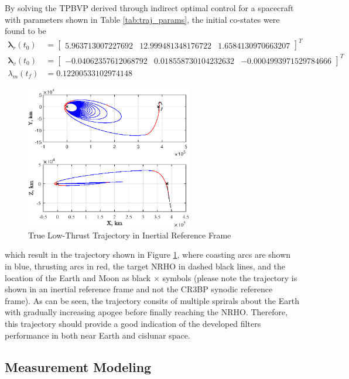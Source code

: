 \documentclass[letterpaper, submit]{AAS}			%
\begin{document}
By solving the TPBVP derived through indirect optimal control for a spacecraft with parameters shown in Table \ref{tab:traj_params}, the initial co-states were found to be
\begin{align*}
	\boldsymbol{\lambda}_r(t_0) &= \begin{bmatrix}
		5.963713007227692 & 12.999481348176722 & 1.6584130970663207
	\end{bmatrix}^T \\
	\boldsymbol{\lambda}_v(t_0) &= \begin{bmatrix}
		-0.04062357612068792 & 0.018558730104232632 & -0.0004993971529784666
	\end{bmatrix}^T \\
	\lambda_m(t_f) &= 0.12200533102974148
\end{align*}
\begin{figure}[hbt!]
	\centering
	\includegraphics[width=0.65\textwidth]{./../../figures/iTraj.eps}
	\caption{True Low-Thrust Trajectory in Inertial Reference Frame}
	\label{fig:traj}
\end{figure}
which result in the trajectory shown in Figure \ref{fig:traj}, where coasting arcs are shown in blue, thrusting arcs in red, the target NRHO in dashed black lines, and the location of the Earth and Moon as black $\times$ symbols (please note the trajectory is shown in an inertial reference frame and not the CR3BP synodic reference frame). As can be seen, the trajectory consits of multiple sprirals about the Earth with gradually increasing apogee before finally reaching the NRHO. Therefore, this trajectory should provide a good indication of the developed filters performance in both near Earth and cislunar space.

\subsection{Measurement Modeling}
\end{document}

